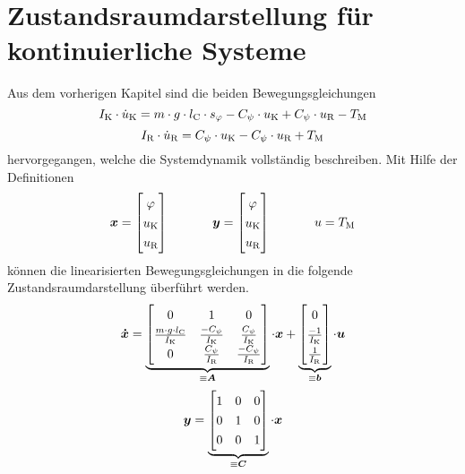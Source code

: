\section{Zustandsraumdarstellung für kontinuierliche Systeme}
Aus dem vorherigen Kapitel sind die beiden Bewegungsgleichungen 
\begin{equation}
I_{\text{K}} \cdot \dot{u}_{\text{K}} = m\cdot g\cdot l_{\text{C}}\cdot s_{\varphi} - C_{\psi}\cdot u_{\text{K}} + C_{\psi} \cdot u_{\text{R}} - T_{\text{M}}
\end{equation}
\begin{equation}
I_{\text{R}}\cdot \dot{u}_{\text{R}} = C_{\psi}\cdot u_{\text{K}} - C_{\psi}\cdot u_{\text{R}} + T_{\text{M}}
\end{equation}
hervorgegangen, welche die Systemdynamik vollständig beschreiben. Mit Hilfe der Definitionen
\begin{equation}
\bs{x} = \begin{bmatrix} \varphi \\ u\idx{K} \\ u\idx{R} \end{bmatrix}
\hspace{35pt}
\bs{y} = \begin{bmatrix} \varphi \\ u\idx{K} \\ u\idx{R} \end{bmatrix}
\hspace{35pt}
u = T\idx{M}
\end{equation}
können die linearisierten Bewegungsgleichungen in die folgende Zustandsraumdarstellung überführt werden.
\begin{equation}
\renewcommand*{\arraystretch}{1.3}
\bs{\dot{x}} = \underbrace{\begin{bmatrix}
0 & 1 & 0 
\\ 
\frac{m\cdot g\cdot l\idx{C}}{I\idx{K}} & \frac{-C_{\psi}}{I\idx{K}} & \frac{C_{\psi}}{I\idx{K}}
\\ 
0 & \frac{C_{\psi}}{I\idx{R}} & \frac{-C_{\psi}}{I\idx{R}}
\end{bmatrix}}_{\equiv \bs{A}} \cdot \bs{x}
+
\underbrace{\begin{bmatrix}
0 \\ \frac{-1}{I\idx{K}} \\ \frac{1}{I\idx{R}}
\end{bmatrix}}_{\equiv \bs{b}} \cdot \bs{u}
\end{equation}
\begin{equation}
\bs{y} = \underbrace{\begin{bmatrix}
1 & 0 & 0 \\ 0 & 1 & 0 \\ 0 & 0 & 1
\end{bmatrix}}_{\equiv \bs{C}} \cdot \bs{x}
\end{equation}
